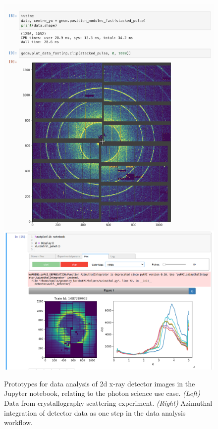 \begin{figure}[tb]
    \centering
    \includegraphics[height=0.27\textheight]{images/photon-science-prototype1.png}
    \includegraphics[height=0.27\textheight]{images/photon-science-prototype2.png}
    \caption{Prototypes for data analysis of 2d x-ray detector images
      in the Jupyter notebook, relating to the
      photon science use case.
      \emph{(Left)} Data from crystallography
      scattering experiment. \emph{(Right)} Azimuthal integration of detector
      data as one step in the data analysis workflow.}
    \label{fig:photon-science-example}
  \end{figure}


